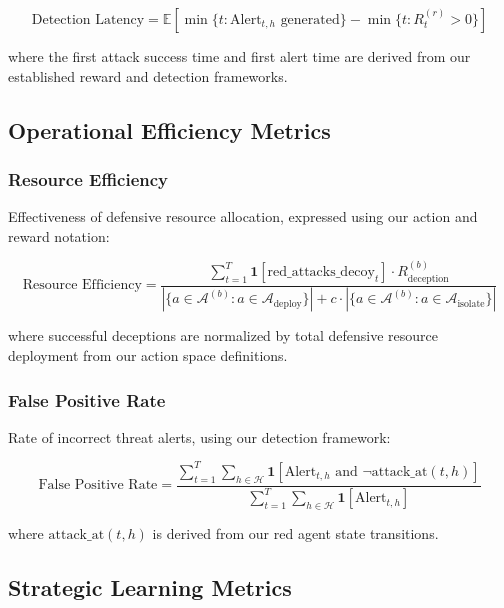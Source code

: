 \documentclass[12pt,oneside]{article}
\begin{document}
\begin{equation}
\text{Detection Latency} = \mathbb{E}\left[\min\{t : \text{Alert}_{t,h} \text{ generated}\} - \min\{t : R^{(r)}_t > 0\}\right]
\end{equation}

where the first attack success time and first alert time are derived from our established reward and detection frameworks.

\subsection{Operational Efficiency Metrics}

\subsubsection{Resource Efficiency}
Effectiveness of defensive resource allocation, expressed using our action and reward notation:

\begin{equation}
\text{Resource Efficiency} = \frac{\sum_{t=1}^{T} \mathbf{1}[\text{red\_attacks\_decoy}_t] \cdot R^{(b)}_{\text{deception}}}{|\{a \in \mathcal{A}^{(b)} : a \in \mathcal{A}_{\text{deploy}}\}| + c \cdot |\{a \in \mathcal{A}^{(b)} : a \in \mathcal{A}_{\text{isolate}}\}|}
\end{equation}

where successful deceptions are normalized by total defensive resource deployment from our action space definitions.

\subsubsection{False Positive Rate}
Rate of incorrect threat alerts, using our detection framework:

\begin{equation}
\text{False Positive Rate} = \frac{\sum_{t=1}^{T} \sum_{h \in \mathcal{H}} \mathbf{1}[\text{Alert}_{t,h} \text{ and } \neg\text{attack\_at}(t,h)]}{\sum_{t=1}^{T} \sum_{h \in \mathcal{H}} \mathbf{1}[\text{Alert}_{t,h}]}
\end{equation}

where $\text{attack\_at}(t,h)$ is derived from our red agent state transitions.

\subsection{Strategic Learning Metrics}
\end{document}
